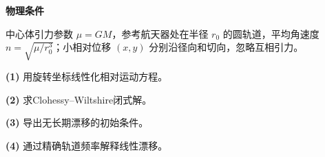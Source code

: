 \textbf{物理条件}\par 中心体引力参数 \(\mu=GM\)，参考航天器处在半径 \(r_0\) 的圆轨道，平均角速度 \(n=\sqrt{\mu/r_0^3}\)；小相对位移 \((x,y)\) 分别沿径向和切向，忽略互相引力。
\par\noindent\textbf{(1)} 用旋转坐标线性化相对运动方程。
\par\noindent\textbf{(2)} 求Clohessy–Wiltshire闭式解。
\par\noindent\textbf{(3)} 导出无长期漂移的初始条件。
\par\noindent\textbf{(4)} 通过精确轨道频率解释线性漂移。
